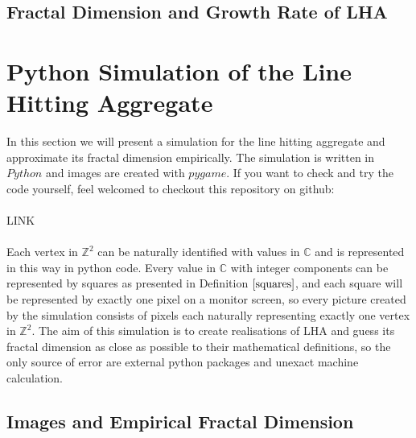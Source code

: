 \documentclass[12pt,a4paper]{scrartcl}
\numberwithin{equation}{subsection}
\newcommand{\C}{\mathbb{C}} %
\newcommand{\Z}{\mathbb{Z}} %
\newcommand{\1}{\mathbbm{1}}
\numberwithin{equation}{section}
\theoremstyle{definition}
\begin{document}
\subsection{Fractal Dimension and Growth Rate of LHA}



\newpage
\section{Python Simulation of the Line Hitting Aggregate}
In this section we will present a simulation for the line hitting aggregate and approximate its fractal dimension empirically. The simulation is written in $\mathit{Python}$ and images are created with $\mathit{pygame}$. If you want to check and try the code yourself, feel welcomed to checkout this repository on github:\\
\\LINK \\
\\Each vertex in $\Z^2$ can be naturally identified with values in $\C$ and is represented in this way in python code. Every value in $\C$ with integer components can be represented by squares as presented in Definition $\ref{squares}$, and each square will be represented by exactly one pixel on a monitor screen, so every picture created by the simulation consists of pixels each naturally representing exactly one vertex in $\Z^2$. The aim of this simulation is to create realisations of LHA and guess its fractal dimension as close as possible to their mathematical definitions, so the only source of error are external python packages and unexact machine calculation. 

\subsection{Images and Empirical Fractal Dimension}
\end{document}
